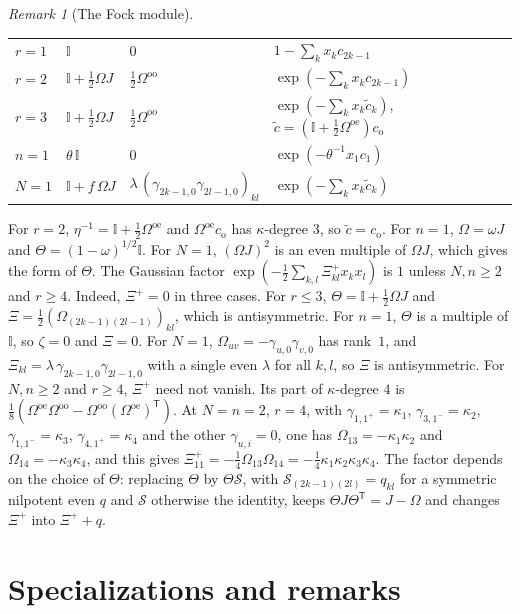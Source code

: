 \documentclass[11pt]{article}
\numberwithin{equation}{section}
\theoremstyle{definition}
\theoremstyle{remark}
\newtheorem{remark}[theorem]{Remark}
\begin{document}
\begin{remark}[The Fock module]
\begin{center}
\begin{tabular}{llll}
$r=1$ & $\mathbb I$ & $0$ & $1-\sum_kx_kc_{2k-1}$\\
$r=2$ & $\mathbb I+\tfrac12\Omega J$ & $\tfrac12\Omega^{\mathrm{oo}}$ & $\exp(-\sum_kx_kc_{2k-1})$\\
$r=3$ & $\mathbb I+\tfrac12\Omega J$ & $\tfrac12\Omega^{\mathrm{oo}}$ & $\exp(-\sum_kx_k\tilde c_k)$, $\tilde c=(\mathbb I+\tfrac12\Omega^{\mathrm{oe}})c_{\mathrm o}$\\
$n=1$ & $\theta\,\mathbb I$ & $0$ & $\exp(-\theta^{-1}x_1c_1)$\\
$N=1$ & $\mathbb I+f\,\Omega J$ & $\lambda\,(\gamma_{2k-1,0}\gamma_{2l-1,0})_{kl}$ & $\exp(-\sum_kx_k\tilde c_k)$
\end{tabular}
\end{center}
For $r=2$, $\eta^{-1}=\mathbb I+\tfrac12\Omega^{\mathrm{oe}}$ and $\Omega^{\mathrm{oe}}c_{\mathrm o}$ has $\kappa$-degree $3$, so
$\tilde c=c_{\mathrm o}$. For $n=1$, $\Omega=\omega J$ and $\Theta=(1-\omega)^{1/2}\mathbb I$. For $N=1$, $(\Omega J)^2$ is an
even multiple of $\Omega J$, which gives the form of $\Theta$. The Gaussian factor
$\exp(-\tfrac12\sum_{k,l}\Xi^+_{kl}x_kx_l)$ is $1$ unless $N,n\geq2$ and $r\geq4$. Indeed, $\Xi^+=0$ in three cases. For $r\leq3$, $\Theta=\mathbb I+\tfrac12\Omega J$ and
$\Xi=\tfrac12(\Omega_{(2k-1)(2l-1)})_{kl}$, which is antisymmetric. For $n=1$, $\Theta$ is a multiple of
$\mathbb I$, so $\zeta=0$ and $\Xi=0$. For $N=1$, $\Omega_{uv}=-\gamma_{u,0}\gamma_{v,0}$ has rank~$1$, and
$\Xi_{kl}=\lambda\,\gamma_{2k-1,0}\gamma_{2l-1,0}$ with a single even $\lambda$ for all $k,l$, so $\Xi$ is
antisymmetric. For $N,n\geq2$ and $r\geq4$, $\Xi^+$ need not vanish. Its part of $\kappa$-degree $4$ is
$\tfrac18(\Omega^{\mathrm{oe}}\Omega^{\mathrm{oo}}-\Omega^{\mathrm{oo}}(\Omega^{\mathrm{oe}})^{\mathsf T})$. At $N=n=2$, $r=4$, with
$\gamma_{1,1^+}=\kappa_1$, $\gamma_{3,1^-}=\kappa_2$, $\gamma_{1,1^-}=\kappa_3$, $\gamma_{4,1^+}=\kappa_4$ and the other
$\gamma_{u,i}=0$, one has $\Omega_{13}=-\kappa_1\kappa_2$ and $\Omega_{14}=-\kappa_3\kappa_4$, and this gives
$\Xi^+_{11}=-\tfrac14\Omega_{13}\Omega_{14}=-\tfrac14\kappa_1\kappa_2\kappa_3\kappa_4$. The factor depends on the
choice of $\Theta$: replacing $\Theta$ by $\Theta\mathcal S$, with $\mathcal S_{(2k-1)(2l)}=q_{kl}$ for a symmetric
nilpotent even $q$ and $\mathcal S$ otherwise the identity, keeps $\Theta J\Theta^{\mathsf T}=J-\Omega$ and changes
$\Xi^+$ into $\Xi^++q$.
\end{remark}

\section{Specializations and remarks}\label{sec:special-remarks}
\end{document}
